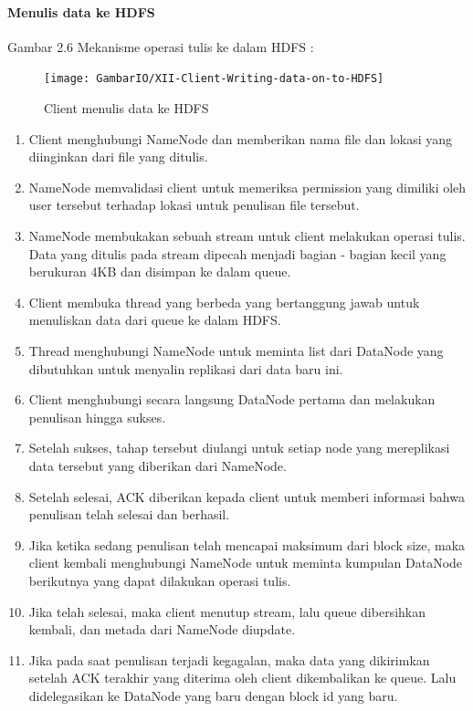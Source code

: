 		\paragraph{Menulis data ke HDFS}
		Gambar 2.6
		Mekanisme operasi tulis ke dalam HDFS :
		
		\begin{figure}[ht]
			\centering
			\texttt{[image: GambarIO/XII-Client-Writing-data-on-to-HDFS]}
			\caption[Client menulis data ke HDFS]{Client menulis data ke HDFS}
			\label{fig:XII-Client-Writing-data-on-to-HDFS}
		\end{figure}
			
			
		\begin{enumerate}
			\item Client menghubungi NameNode dan memberikan nama file dan lokasi yang diinginkan dari file yang ditulis.
			\item NameNode memvalidasi client untuk memeriksa permission yang dimiliki oleh user tersebut terhadap lokasi untuk penulisan file tersebut.
			\item NameNode membukakan sebuah stream untuk client melakukan operasi tulis. Data yang ditulis pada stream dipecah menjadi bagian - bagian kecil yang berukuran 4KB dan disimpan ke dalam queue.
			\item Client membuka thread yang berbeda yang bertanggung jawab untuk menuliskan data dari queue ke dalam HDFS.
			\item Thread menghubungi NameNode untuk meminta list dari DataNode yang dibutuhkan untuk menyalin replikasi dari data baru ini.
			\item Client menghubungi secara langsung DataNode pertama dan melakukan penulisan hingga sukses.
			\item Setelah sukses, tahap tersebut diulangi untuk setiap node yang mereplikasi data tersebut yang diberikan dari NameNode.
			\item Setelah selesai, ACK diberikan kepada client untuk memberi informasi bahwa penulisan telah selesai dan berhasil.
			\item Jika ketika sedang penulisan telah mencapai maksimum dari block size, maka client kembali menghubungi NameNode untuk meminta kumpulan DataNode berikutnya yang dapat dilakukan operasi tulis.
			\item Jika telah selesai, maka client menutup stream, lalu queue dibersihkan kembali, dan metada dari NameNode diupdate.
			\item Jika pada saat penulisan terjadi kegagalan, maka data yang dikirimkan setelah ACK terakhir yang diterima oleh client dikembalikan ke queue. Lalu didelegasikan ke DataNode yang baru dengan block id yang baru.
		\end{enumerate}
		
